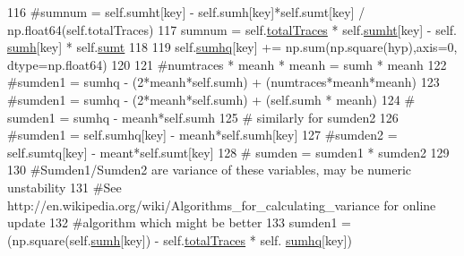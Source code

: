 \begin{DoxyCode}
{116             \textcolor{comment}{#sumnum =  self.sumht[key] - self.sumh[key]*self.sumt[key] / np.float64(self.totalTraces)}
117             sumnum = self.\hyperlink{classsoftware_1_1chipwhisperer_1_1analyzer_1_1attacks_1_1cpa__algorithms_1_1progressive_1_1CPAProgressiveOneSubkey_a07a202a4af63fed2b3d66043eca926b6}{totalTraces} * self.\hyperlink{classsoftware_1_1chipwhisperer_1_1analyzer_1_1attacks_1_1cpa__algorithms_1_1progressive_1_1CPAProgressiveOneSubkey_abd38d5556813178f7c8b0b4f45bed94c}{sumht}[key] - self.
      \hyperlink{classsoftware_1_1chipwhisperer_1_1analyzer_1_1attacks_1_1cpa__algorithms_1_1progressive_1_1CPAProgressiveOneSubkey_aaf99598968c1ab0c7836bf3fdee9c309}{sumh}[key] * self.\hyperlink{classsoftware_1_1chipwhisperer_1_1analyzer_1_1attacks_1_1cpa__algorithms_1_1progressive_1_1CPAProgressiveOneSubkey_a061db56508f9340132d55ec9cf0a0ed0}{sumt}
118 
119             self.\hyperlink{classsoftware_1_1chipwhisperer_1_1analyzer_1_1attacks_1_1cpa__algorithms_1_1progressive_1_1CPAProgressiveOneSubkey_a013ea5a2bd363d6d5aaf953e5dbee0dd}{sumhq}[key] += np.sum(np.square(hyp),axis=0, dtype=np.float64)
120 
121             \textcolor{comment}{#numtraces * meanh * meanh = sumh * meanh}
122             \textcolor{comment}{#sumden1 = sumhq - (2*meanh*self.sumh) + (numtraces*meanh*meanh)}
123             \textcolor{comment}{#sumden1 = sumhq - (2*meanh*self.sumh) + (self.sumh * meanh)}
124             \textcolor{comment}{# sumden1 = sumhq - meanh*self.sumh}
125             \textcolor{comment}{# similarly for sumden2}
126             \textcolor{comment}{#sumden1 = self.sumhq[key] - meanh*self.sumh[key]}
127             \textcolor{comment}{#sumden2 = self.sumtq[key] - meant*self.sumt[key]}
128             \textcolor{comment}{# sumden = sumden1 * sumden2}
129 
130             \textcolor{comment}{#Sumden1/Sumden2 are variance of these variables, may be numeric unstability}
131             \textcolor{comment}{#See http://en.wikipedia.org/wiki/Algorithms\_for\_calculating\_variance for online update}
132             \textcolor{comment}{#algorithm which might be better}
133             sumden1 = (np.square(self.\hyperlink{classsoftware_1_1chipwhisperer_1_1analyzer_1_1attacks_1_1cpa__algorithms_1_1progressive_1_1CPAProgressiveOneSubkey_aaf99598968c1ab0c7836bf3fdee9c309}{sumh}[key]) - self.\hyperlink{classsoftware_1_1chipwhisperer_1_1analyzer_1_1attacks_1_1cpa__algorithms_1_1progressive_1_1CPAProgressiveOneSubkey_a07a202a4af63fed2b3d66043eca926b6}{totalTraces} * self.
      \hyperlink{classsoftware_1_1chipwhisperer_1_1analyzer_1_1attacks_1_1cpa__algorithms_1_1progressive_1_1CPAProgressiveOneSubkey_a013ea5a2bd363d6d5aaf953e5dbee0dd}{sumhq}[key])
}
\end{DoxyCode}
